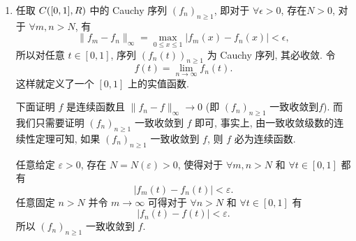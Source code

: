 \begin{enumerate}
\begin{answer}
\begin{enumerate}
          \item 任取 $C([0,1],\\R)$ 中的 Cauchy 序列 $(f_n)_{n\geq 1}$, 
          即对于 $\forall\epsilon>0$, 存在$N>0$, 对于 $\forall m,n>N$, 有
          \[\|f_m-f_n\|_{\infty}=\max_{0\leq x\leq 1}|f_m(x)-f_n(x)|<\epsilon,\]
          所以对任意 $t\in[0,1]$, 序列 $(f_n(t))_{n\geq 1}$ 为 Cauchy 序列, 其必收敛. 令
          \[f(t)=\lim_{n\to\infty}f_n(t).\]
          这样就定义了一个 $[0,1]$ 上的实值函数. 
          
          下面证明 $f$ 是连续函数且 $\|f_n-f\|_{\infty}\to 0$ (即 $(f_n)_{n\geq 1}$ 一致收敛到$f$). 
          而我们只需要证明 $(f_n)_{n\geq 1}$ 一致收敛到 $f$ 即可,
          事实上, 由一致收敛级数的连续性定理可知, 如果 $(f_n)_{n\geq 1}$ 一致收敛到 $f$, 则
          $f$ 必为连续函数.
          
          任意给定 $\varepsilon>0$, 存在 $N=N(\varepsilon)>0$, 
          使得对于 $\forall m,n>N$ 和 $\forall t\in[0,1]$ 都有 
          \[|f_m(t)-f_n(t)|<\varepsilon.\]
          任意固定 $n>N$ 并令 $m\to\infty$ 可得对于 $\forall n>N$ 和 $\forall t\in[0,1]$ 有
          \[|f_n(t)-f(t)|<\varepsilon.\]
          所以 $(f_n)_{n\geq 1}$ 一致收敛到 $f$.
          

\end{enumerate}
\end{answer}
\end{enumerate}
